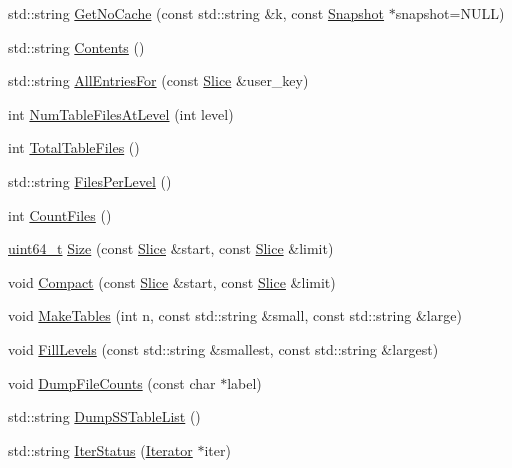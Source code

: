 \begin{DoxyCompactItemize}
\item 
std\+::string \hyperlink{classleveldb_1_1_d_b_test_a3e3e12e84828f57e6e2aec4e998f03fe}{Get\+No\+Cache} (const std\+::string \&k, const \hyperlink{classleveldb_1_1_snapshot}{Snapshot} $\ast$snapshot=N\+U\+L\+L)
\item 
std\+::string \hyperlink{classleveldb_1_1_d_b_test_a3cf871664bd22c6ed2d6c2a8834b49fc}{Contents} ()
\item 
std\+::string \hyperlink{classleveldb_1_1_d_b_test_adaf171601eaaf2cd24edaa394752f733}{All\+Entries\+For} (const \hyperlink{classleveldb_1_1_slice}{Slice} \&user\+\_\+key)
\item 
int \hyperlink{classleveldb_1_1_d_b_test_aa7c845810f6d57b0655eda370e8de33f}{Num\+Table\+Files\+At\+Level} (int level)
\item 
int \hyperlink{classleveldb_1_1_d_b_test_a05fa745351a41ecc0165b391a605b79e}{Total\+Table\+Files} ()
\item 
std\+::string \hyperlink{classleveldb_1_1_d_b_test_a0e4d6292bcbe450d34b558d48a51a331}{Files\+Per\+Level} ()
\item 
int \hyperlink{classleveldb_1_1_d_b_test_a0c6c0c1d470a50fdcb6cdbc54977e907}{Count\+Files} ()
\item 
\hyperlink{stdint_8h_aaa5d1cd013383c889537491c3cfd9aad}{uint64\+\_\+t} \hyperlink{classleveldb_1_1_d_b_test_a2b16106ccbd302127b5c0575e74e6be1}{Size} (const \hyperlink{classleveldb_1_1_slice}{Slice} \&start, const \hyperlink{classleveldb_1_1_slice}{Slice} \&limit)
\item 
void \hyperlink{classleveldb_1_1_d_b_test_a9b6cd10fd7c8fc54127b0c40c0ac7db5}{Compact} (const \hyperlink{classleveldb_1_1_slice}{Slice} \&start, const \hyperlink{classleveldb_1_1_slice}{Slice} \&limit)
\item 
void \hyperlink{classleveldb_1_1_d_b_test_ace931478fa5ad2c48a8aa95a344e19fd}{Make\+Tables} (int n, const std\+::string \&small, const std\+::string \&large)
\item 
void \hyperlink{classleveldb_1_1_d_b_test_ac291d06db907f5fee7caf04f44f65493}{Fill\+Levels} (const std\+::string \&smallest, const std\+::string \&largest)
\item 
void \hyperlink{classleveldb_1_1_d_b_test_ad045c5203b4ea785ab335ffc3ea833b3}{Dump\+File\+Counts} (const char $\ast$label)
\item 
std\+::string \hyperlink{classleveldb_1_1_d_b_test_afdfc077be555dea7eac220623f6d4deb}{Dump\+S\+S\+Table\+List} ()
\item 
std\+::string \hyperlink{classleveldb_1_1_d_b_test_ad162fa0f5a31e61ee94ba9f45af716f8}{Iter\+Status} (\hyperlink{classleveldb_1_1_iterator}{Iterator} $\ast$iter)

\end{DoxyCompactItemize}
